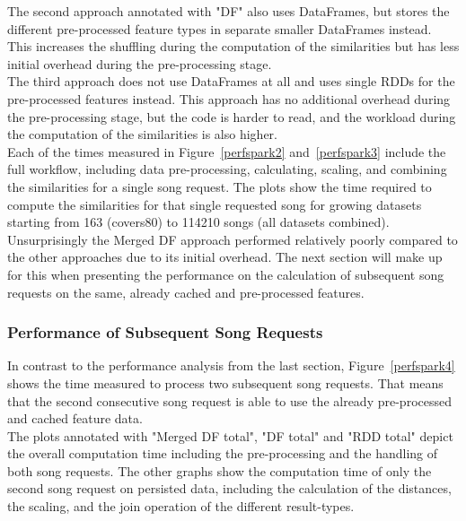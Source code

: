 \noindent The second approach annotated with "DF" also uses DataFrames, but stores the different pre-processed feature types in separate smaller DataFrames instead. This increases the shuffling during the computation of the similarities but has less initial overhead during the pre-processing stage.\\
The third approach does not use DataFrames at all and uses single RDDs for the pre-processed features instead. This approach has no additional overhead during the pre-processing stage, but the code is harder to read, and the workload during the computation of the similarities is also higher.\\
Each of the times measured in Figure~\ref{perfspark2} and~\ref{perfspark3} include the full workflow, including data pre-processing, calculating, scaling, and combining the similarities for a single song request. The plots show the time required to compute the similarities for that single requested song for growing datasets starting from 163 (covers80) to 114210 songs (all datasets combined). 
\noindent Unsurprisingly the Merged DF approach performed relatively poorly compared to the other approaches due to its initial overhead. The next section will make up for this when presenting the performance on the calculation of subsequent song requests on the same, already cached and pre-processed features.

\subsubsection{Performance of Subsequent Song Requests}

In contrast to the performance analysis from the last section, Figure~\ref{perfspark4} shows the time measured to process two subsequent song requests. That means that the second consecutive song request is able to use the already pre-processed and cached feature data.\\ %
\noindent The plots annotated with "Merged DF total", "DF total" and "RDD total" depict the overall computation time including the pre-processing and the handling of both song requests. The other graphs show the computation time of only the second song request on persisted data, including the calculation of the distances, the scaling, and the join operation of the different result-types.

